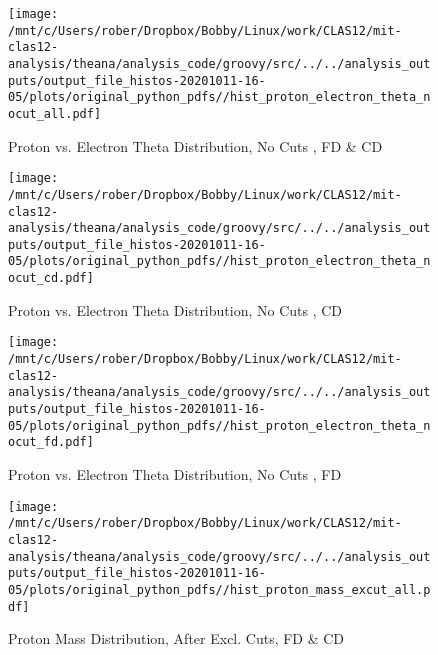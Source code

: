 \documentclass{article}
\begin{document}
\begin{landscape}
    \begin{figure}[h]
        \centering

        \texttt{[image: /mnt/c/Users/rober/Dropbox/Bobby/Linux/work/CLAS12/mit-clas12-analysis/theana/analysis\_code/groovy/src/../../analysis\_outputs/output\_file\_histos-20201011-16-05/plots/original\_python\_pdfs//hist\_proton\_electron\_theta\_nocut\_all.pdf]}
        \captionsetup{textformat=empty,labelformat=blank}
        \caption{Proton vs. Electron Theta Distribution, No Cuts , FD \& CD}
    \end{figure}
    \clearpage
    
    \begin{figure}[h]
        \centering

        \texttt{[image: /mnt/c/Users/rober/Dropbox/Bobby/Linux/work/CLAS12/mit-clas12-analysis/theana/analysis\_code/groovy/src/../../analysis\_outputs/output\_file\_histos-20201011-16-05/plots/original\_python\_pdfs//hist\_proton\_electron\_theta\_nocut\_cd.pdf]}
        \captionsetup{textformat=empty,labelformat=blank}
        \caption{Proton vs. Electron Theta Distribution, No Cuts , CD}
    \end{figure}
    \clearpage
    
    \begin{figure}[h]
        \centering

        \texttt{[image: /mnt/c/Users/rober/Dropbox/Bobby/Linux/work/CLAS12/mit-clas12-analysis/theana/analysis\_code/groovy/src/../../analysis\_outputs/output\_file\_histos-20201011-16-05/plots/original\_python\_pdfs//hist\_proton\_electron\_theta\_nocut\_fd.pdf]}
        \captionsetup{textformat=empty,labelformat=blank}
        \caption{Proton vs. Electron Theta Distribution, No Cuts , FD}
    \end{figure}
    \clearpage
    
    \begin{figure}[h]
        \centering

        \texttt{[image: /mnt/c/Users/rober/Dropbox/Bobby/Linux/work/CLAS12/mit-clas12-analysis/theana/analysis\_code/groovy/src/../../analysis\_outputs/output\_file\_histos-20201011-16-05/plots/original\_python\_pdfs//hist\_proton\_mass\_excut\_all.pdf]}
        \captionsetup{textformat=empty,labelformat=blank}
        \caption{Proton Mass Distribution, After Excl. Cuts, FD \& CD}
    \end{figure}
    \clearpage
    
    \begin{figure}[h]
        \centering


\end{figure}
\end{landscape}
\end{document}
